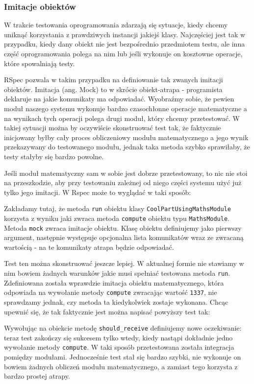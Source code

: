     \subsubsection{Imitacje obiektów}
    W trakcie testowania oprogramowania zdarzają się sytuacje, kiedy chcemy uniknąć korzystania z prawdziwych instancji jakiejś klasy. Najczęściej jest tak w przypadku, kiedy dany obiekt nie jest bezpośrednio przedmiotem testu, ale inna część oprogramowania polega na nim lub jeśli wykonuje on kosztowne operacje, które spowalniają testy.
    
    RSpec pozwala w takim przypadku na definiowanie tak zwanych imitacji obiektów. Imitacja (ang. Mock) to w skrócie obiekt-atrapa - programista deklaruje na jakie komunikaty ma odpowiadać. Wyobraźmy sobie, że pewien moduł naszego systemu wykonuje bardzo czasochłonne operacje matematyczne a na wynikach tych operacji polega drugi moduł, który chcemy przetestować. W takiej sytuacji można by oczywiście skonstruować test tak, że faktycznie inicjowany byłby cały proces obliczeniowy modułu matematycznego a jego wynik przekazywany do testowanego modułu, jednak taka metoda szybko sprawiłaby, że testy stałyby się bardzo powolne. 
    
    Jeśli moduł matematyczny sam w sobie jest dobrze przetestowany, to nic nie stoi na przeszkodzie, aby przy testowaniu zależnej od niego części systemu użyć już tylko jego imitacji. W Rspec może to wyglądać w taki sposób:
    
    
    
    Zakładamy tutaj, że metoda \texttt{run} obiektu klasy \texttt{CoolPartUsingMathsModule} korzysta z wyniku jaki zwraca metoda \texttt{compute} obiektu typu \texttt{MathsModule}. Metoda \texttt{mock} zwraca imitacje obiektu. Klasę obiektu definiujemy jako pierwszy argument, następnie występuje opcjonalna lista komunikatów wraz ze zwracaną wartością - na te komunikaty atrapa będzie odpowiadać.
    
    Test ten można skonstruować jeszcze lepiej. W aktualnej formie nie stawiamy w nim bowiem żadnych warunków jakie musi spełniać testowana metoda \texttt{run}. Zdefiniowana została wprawdzie imitacja obiektu matematycznego, która odpowiada na wywołanie metody \texttt{compute} zwracając wartość \texttt{1337}, nie sprawdzamy jednak, czy metoda ta kiedykolwiek zostaje wykonana. Chcąc upewnić się, że tak faktycznie jest można napisać powyższy test tak:
    
    

    
    Wywołując na obiekcie metodę \texttt{should\_receive} definiujemy nowe oczekiwanie: teraz test zakończy się sukcesem tylko wtedy, kiedy nastąpi dokładnie jedno wywołanie metody \texttt{compute}. W taki sposób przetestowana została integracja pomiędzy modułami. Jednocześnie test stał się bardzo szybki, nie wykonuje on bowiem żadnych obliczeń modułu matematycznego, a zamiast tego korzysta z bardzo prostej atrapy.
